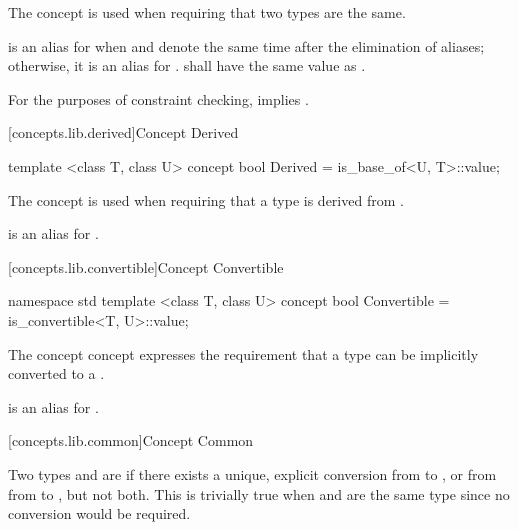 \begin{addedblock}
\begin{itemdescr}
\pnum
The  concept is used when requiring that two types are the same.

\pnum
{} is an alias for  when  and 
denote the same time after the elimination of aliases; otherwise, it is an alias for
.  shall have the same value as
.

\pnum
\remarks For the purposes of constraint checking,  implies
.
\end{itemdescr}

[concepts.lib.derived]{Concept Derived}

%
\begin{itemdecl}
template <class T, class U>
concept bool Derived = is_base_of<U, T>::value;
\end{itemdecl}

\begin{itemdescr}
\pnum
The  concept is used when requiring that a type  is derived
from .

\pnum
{} is an alias for .
\end{itemdescr}

[concepts.lib.convertible]{Concept Convertible}

%
\begin{itemdecl}
namespace std {
  template <class T, class U>
  concept bool Convertible = is_convertible<T, U>::value;
}
\end{itemdecl}

\begin{itemdescr}
\pnum
The  concept concept expresses the requirement that a type
 can be implicitly converted to a .

\pnum
{} is an alias for .
\end{itemdescr}

[concepts.lib.common]{Concept Common}

\pnum
Two types  and  are  if
there exists a unique, explicit conversion from  to , or from
from  to , but not both. \enternote This is trivially true
when  and  are the same type since no conversion would be
required.\exitnote


\end{addedblock}
